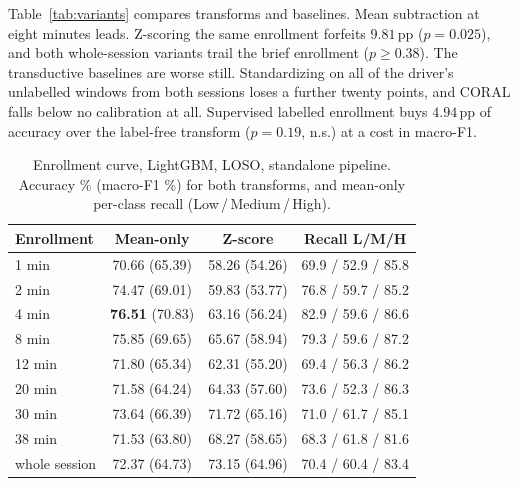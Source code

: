 \documentclass[journal]{IEEEtran}
\newcommand{\pp}{\,pp}
\begin{document}
Table~\ref{tab:variants} compares transforms and baselines. Mean subtraction
at eight minutes leads. Z-scoring the same enrollment forfeits $9.81$\pp{}
($p=0.025$), and both whole-session variants trail the brief enrollment
($p\ge0.38$). The transductive baselines are worse still. Standardizing on
all of the driver's unlabelled windows from both sessions loses a further
twenty points, and CORAL falls below no calibration at all. Supervised
labelled enrollment buys $4.94$\pp{} of accuracy over the label-free transform
($p=0.19$, n.s.) at a cost in macro-F1.

\begin{table}[!t]
\caption{Enrollment curve, LightGBM, LOSO, standalone pipeline. Accuracy \%
(macro-F1 \%) for both transforms, and mean-only per-class recall
(Low\,/\,Medium\,/\,High).}
\label{tab:enroll}
\centering\footnotesize
\setlength{\tabcolsep}{3.5pt}
\begin{tabular}{@{}lccc@{}}
\toprule
Enrollment & Mean-only & Z-score & Recall L/M/H \\
\midrule
1 min  & 70.66 (65.39) & 58.26 (54.26) & 69.9 / 52.9 / 85.8 \\
2 min  & 74.47 (69.01) & 59.83 (53.77) & 76.8 / 59.7 / 85.2 \\
4 min  & \textbf{76.51} (70.83) & 63.16 (56.24) & 82.9 / 59.6 / 86.6 \\
8 min  & 75.85 (69.65) & 65.67 (58.94) & 79.3 / 59.6 / 87.2 \\
12 min & 71.80 (65.34) & 62.31 (55.20) & 69.4 / 56.3 / 86.2 \\
20 min & 71.58 (64.24) & 64.33 (57.60) & 73.6 / 52.3 / 86.3 \\
30 min & 73.64 (66.39) & 71.72 (65.16) & 71.0 / 61.7 / 85.1 \\
38 min & 71.53 (63.80) & 68.27 (58.65) & 68.3 / 61.8 / 81.6 \\
whole session & 72.37 (64.73) & 73.15 (64.96) & 70.4 / 60.4 / 83.4 \\
\bottomrule
\end{tabular}
\end{table}
\end{document}
